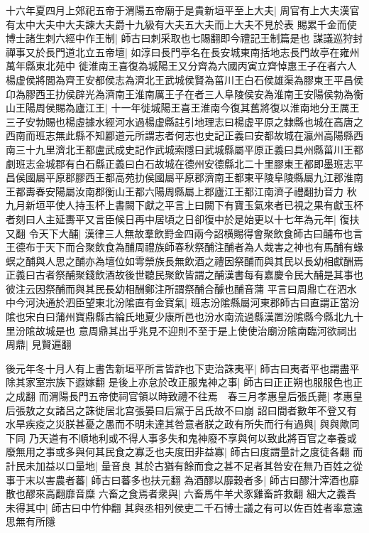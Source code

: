 十六年夏四月上郊祀五帝于渭陽五帝廟于是貴新垣平至上大夫|{
	周官有上大夫漢官有太中大夫中大夫諫大夫爵十九級有大夫五大夫而上大夫不見於表}
賜累千金而使博士諸生刺六經中作王制|{
	師古曰刺采取也七賜翻即今禮記王制篇是也}
謀議巡狩封禪事又於長門道北立五帝壇|{
	如淳曰長門亭名在長安城東南括地志長門故亭在雍州萬年縣東北苑中}
徙淮南王喜復為城陽王又分齊為六國丙寅立齊悼惠王子在者六人楊虚侯將閭為齊王安都侯志為濟北王武城侯賢為菑川王白石侯雄渠為膠東王平昌侯卬為膠西王扐侯辟光為濟南王淮南厲王子在者三人阜陵侯安為淮南王安陽侯勃為衡山王陽周侯賜為廬江王|{
	十一年徙城陽王喜王淮南今復其舊將復以淮南地分王厲王三子安勃賜也楊虛據水經河水過楊虚縣註引地理志曰楊虚平原之隸縣也城在高唐之西南而班志無此縣不知酈道元所謂志者何志也史記正義曰安都故城在瀛州高陽縣西南三十九里濟北王都盧武成史記作武城索隱曰武城縣屬平原正義曰具州縣菑川王都劇班志金城郡有白石縣正義曰白石故城在德州安德縣北二十里膠東王都即墨班志平昌侯國屬平原郡膠西王都高苑扐侯國屬平原郡濟南王都東平陵阜陵縣屬九江郡淮南王都夀春安陽屬汝南郡衡山王都六陽周縣屬上郡廬江王都江南濟子禮翻扐音力}
秋九月新垣平使人持玉杯上書闕下獻之平言上曰闕下有寶玉氣來者已視之果有獻玉杯者刻曰人主延夀平又言臣候日再中居頃之日卻復中於是始更以十七年為元年|{
	復扶又翻}
令天下大酺|{
	漢律三人無故羣飲罸金四兩今詔横賜得會聚飲食師古曰酺布也言王德布于天下而合聚飲食為酺周禮族師春秋祭酺注酺者為人烖害之神也有馬酺有蝝螟之酺與人思之酺亦為壇位如雩禜族長無飲酒之禮因祭酺而與其民以長幼相獻酬焉正義曰古者祭酺聚錢飲酒故後世聽民聚飲皆謂之酺漢書每有嘉慶令民大酺是其事也彼注云因祭酺而與其民長幼相酬鄭注所謂祭酺合醵也酺音蒲}
平言曰周鼎亡在泗水中今河決通於泗臣望東北汾隂直有金寶氣|{
	班志汾隂縣屬河東郡師古曰直謂正當汾隂也宋白曰蒲州寶鼎縣古綸氏地夏少康所邑也汾水南流過縣漢置汾隂縣今縣北九十里汾隂故城是也}
意周鼎其出乎兆見不迎則不至于是上使使治廟汾隂南臨河欲祠出周鼎|{
	見賢遍翻}


後元年冬十月人有上書吿新垣平所言皆詐也下吏治誅夷平|{
	師古曰夷者平也謂盡平除其家室宗族下遐嫁翻}
是後上亦怠於改正服鬼神之事|{
	師古曰正正朔也服服色也正之成翻}
而渭陽長門五帝使祠官領以時致禮不往焉　春三月孝惠皇后張氏薨|{
	孝惠皇后張敖之女諸呂之誅徙居北宫張晏曰后黨于呂氏故不曰崩}
詔曰間者數年不登又有水旱疾疫之災朕甚憂之愚而不明未達其咎意者朕之政有所失而行有過與|{
	與與歟同下同}
乃天道有不順地利或不得人事多失和鬼神廢不享與何以致此將百官之奉養或廢無用之事或多與何其民食之寡乏也夫度田非益寡|{
	師古曰度謂量計之度徒各翻}
而計民未加益以口量地|{
	量音良}
其於古猶有餘而食之甚不足者其咎安在無乃百姓之從事于末以害農者蕃|{
	師古曰蕃多也扶元翻}
為酒醪以靡穀者多|{
	師古曰醪汁滓酒也靡散也醪來高翻靡音糜}
六畜之食焉者衆與|{
	六畜馬牛羊犬豕雞畜許救翻}
細大之義吾未得其中|{
	師古曰中竹仲翻}
其與丞相列侯吏二千石博士議之有可以佐百姓者率意遠思無有所隱

